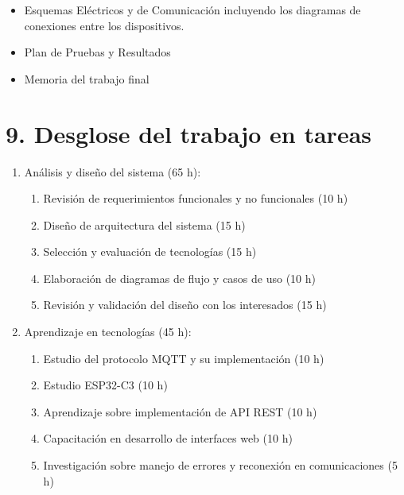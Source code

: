 \documentclass[
11pt, %
]{charter}
\begin{document}
\begin{itemize}
\item Esquemas Eléctricos y de Comunicación incluyendo los diagramas de conexiones entre los dispositivos.
\item Plan de Pruebas y Resultados
\item Memoria del trabajo final

\end{itemize}


\section{9. Desglose del trabajo en tareas}
\label{sec:wbs}

\begin{enumerate}
\item Análisis y diseño del sistema (65 h):
\begin{enumerate}
\item Revisión de requerimientos funcionales y no funcionales (10 h)
\item Diseño de arquitectura del sistema (15 h)
\item Selección y evaluación de tecnologías (15 h)
\item Elaboración de diagramas de flujo y casos de uso (10 h)
\item Revisión y validación del diseño con los interesados (15 h)
\end{enumerate}

\item Aprendizaje en tecnologías (45 h):
\begin{enumerate}
\item Estudio del protocolo MQTT y su implementación (10 h)
\item Estudio ESP32-C3 (10 h)
\item Aprendizaje sobre implementación de API REST (10 h)
\item Capacitación en desarrollo de interfaces web (10 h)
\item Investigación sobre manejo de errores y reconexión en comunicaciones (5 h)
\end{enumerate}


\end{enumerate}
\end{document}
